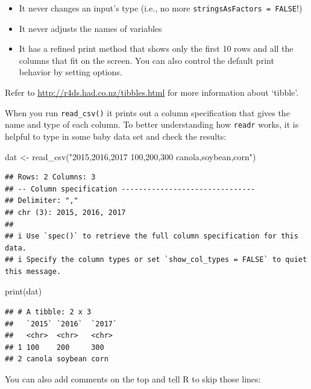\documentclass[
  12pt,
]{krantz}
\makeatletter
\newenvironment{Shaded}{\begin{snugshade}}{\end{snugshade}}
\newcommand{\FunctionTok}[1]{\textcolor[rgb]{0,0,0}{#1}}
\newcommand{\NormalTok}[1]{#1}
\newcommand{\OtherTok}[1]{\textcolor[rgb]{0.37,0.37,0.37}{#1}}
\newcommand{\StringTok}[1]{\textcolor[rgb]{0.5,0.5,0.5}{#1}}
\providecommand{\tightlist}{%
  \setlength{\itemsep}{0pt}\setlength{\parskip}{0pt}}
\newenvironment{kframe}{%
\medskip{}
\setlength{\fboxsep}{.8em}
 \def\at@end@of@kframe{}%
 \ifinner\ifhmode%
  \def\at@end@of@kframe{\end{minipage}}%
  \begin{minipage}{\columnwidth}%
 \fi\fi%
 \def\FrameCommand##1{\hskip\@totalleftmargin \hskip-\fboxsep
 \colorbox{shadecolor}{##1}\hskip-\fboxsep
     \hskip-\linewidth \hskip-\@totalleftmargin \hskip\columnwidth}%
 \MakeFramed {\advance\hsize-\width
   \@totalleftmargin\z@ \linewidth\hsize
   \@setminipage}}%
 {\par\unskip\endMakeFramed%
 \at@end@of@kframe}
\renewenvironment{Shaded}{\begin{kframe}}{\end{kframe}}
\makeatother
\begin{document}
\begin{itemize}
\tightlist
\item
  It never changes an input's type (i.e., no more \texttt{stringsAsFactors\ =\ FALSE}!)
\item
  It never adjusts the names of variables
\item
  It has a refined print method that shows only the first 10 rows and all the columns that fit on the screen. You can also control the default print behavior by setting options.
\end{itemize}

Refer to \url{http://r4ds.had.co.nz/tibbles.html} for more information about `tibble'.

When you run \texttt{read\_csv()} it prints out a column specification that gives the name and type of each column. To better understanding how \texttt{readr} works, it is helpful to type in some baby data set and check the results:

\begin{Shaded}
\begin{Highlighting}[]
\NormalTok{dat }\OtherTok{\textless{}{-}} \FunctionTok{read\_csv}\NormalTok{(}\StringTok{"2015,2016,2017}
\StringTok{100,200,300}
\StringTok{canola,soybean,corn"}\NormalTok{)}
\end{Highlighting}
\end{Shaded}

\begin{verbatim}
## Rows: 2 Columns: 3
## -- Column specification -------------------------------
## Delimiter: ","
## chr (3): 2015, 2016, 2017
## 
## i Use `spec()` to retrieve the full column specification for this data.
## i Specify the column types or set `show_col_types = FALSE` to quiet this message.
\end{verbatim}

\begin{Shaded}
\begin{Highlighting}[]
\FunctionTok{print}\NormalTok{(dat)}
\end{Highlighting}
\end{Shaded}

\begin{verbatim}
## # A tibble: 2 x 3
##   `2015` `2016`  `2017`
##   <chr>  <chr>   <chr> 
## 1 100    200     300   
## 2 canola soybean corn
\end{verbatim}

You can also add comments on the top and tell R to skip those lines:
\end{document}

